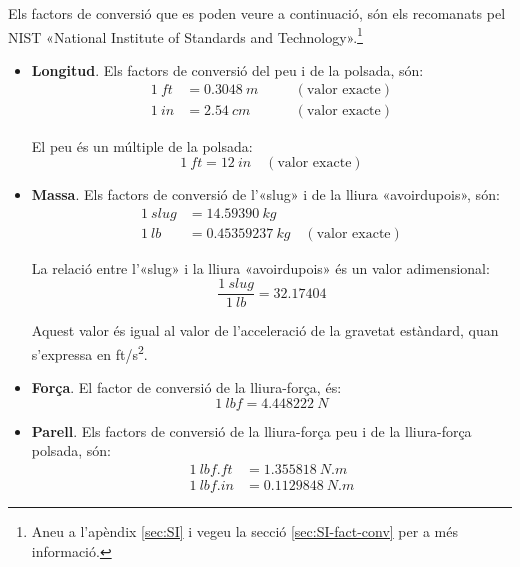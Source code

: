Els factors de conversió que es poden veure a continuació, són els recomanats pel NIST «National Institute of Standards and Technology».\footnote{Aneu a l'apèndix \ref{sec:SI} i vegeu la secció \ref{sec:SI-fact-conv} per a més informació.}

\begin{itemize}
    \item \textbf{Longitud}. Els factors de conversió del peu i de la polsada, són:
    \begin{subequations}
    \begin{alignat}{3}
      \SI{1}{ft} &= \SI{0,3048}{m} &&\quad(\text{valor exacte}) \\
      \SI{1}{in} &= \SI{2,54}{cm} &&\quad(\text{valor exacte})
    \end{alignat}
    \end{subequations}

    El peu és un múltiple  de la polsada:
    \begin{equation}
      \SI{1}{ft} = \SI{12}{in}\quad(\text{valor exacte})
    \end{equation}

    \item \textbf{Massa}. Els factors de conversió de l'«slug»  i de la lliura «avoirdupois», són:
    \begin{subequations}
    \begin{align}
      \SI{1}{slug} &= \SI{14,59390}{kg} \\
      \SI{1}{lb} &= \SI{0,45359237}{kg}\quad(\text{valor exacte})
    \end{align}
    \end{subequations}

    La relació entre l'«slug» i la lliura «avoirdupois» és un valor adimensional:
    \begin{equation}
        \frac{\SI{1}{slug}}{\SI{1}{lb}}=\num{32,17404}
    \end{equation}

    Aquest valor és igual al valor de l'acceleració de la gravetat estàndard, quan s'expressa en \si{ft/s^2}.

    \item \textbf{Força}. El factor de conversió de la lliura-força, és:
    \begin{equation}
        \SI{1}{lbf} = \SI{4,448222}{N}
    \end{equation}

    \item \textbf{Parell}. Els factors de conversió de la lliura-força peu  i de la lliura-força polsada, són:
    \begin{subequations}
    \begin{align}
      \SI{1}{lbf.ft} &= \SI{1,355818}{N.m} \\
      \SI{1}{lbf.in} &= \SI{0,1129848}{N.m}
    \end{align}
    \end{subequations}


\end{itemize}
